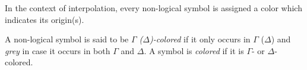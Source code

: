 In the context of interpolation, every non-logical symbol is assigned a color which indicates its origin(s). 
\begin{defi}[Coloring]
A non-logical symbol is said to be \emph{$\Gamma$ ($\Delta$)-colored} if it only occurs in $\Gamma$ ($\Delta$) and \emph{grey} in case it occurs in both $\Gamma$ and $\Delta$. A symbol is \emph{colored} if it is $\Gamma$- or $\Delta$-colored.
\end{defi}
